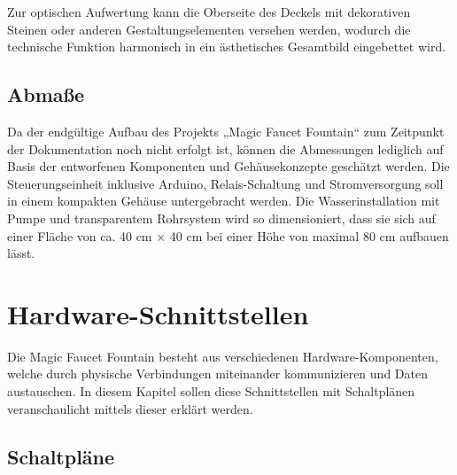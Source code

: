 Zur optischen Aufwertung kann die Oberseite des Deckels mit dekorativen Steinen oder anderen Gestaltungselementen versehen werden, wodurch die technische Funktion harmonisch in ein ästhetisches Gesamtbild eingebettet wird.

\subsection{Abmaße}
Da der endgültige Aufbau des Projekts „Magic Faucet Fountain“ zum Zeitpunkt der Dokumentation noch nicht erfolgt ist, können die Abmessungen lediglich auf Basis der entworfenen Komponenten und Gehäusekonzepte geschätzt werden. Die Steuerungseinheit inklusive Arduino, Relais-Schaltung und Stromversorgung soll in einem kompakten Gehäuse untergebracht werden. Die Wasserinstallation mit Pumpe und transparentem Rohrsystem wird so dimensioniert, dass sie sich auf einer Fläche von ca. 40 cm × 40 cm bei einer Höhe von maximal 80 cm aufbauen lässt.

\section{Hardware-Schnittstellen}
Die Magic Faucet Fountain besteht aus verschiedenen Hardware-Komponenten, welche durch physische Verbindungen miteinander kommunizieren und Daten austauschen. In diesem Kapitel sollen diese Schnittstellen mit Schaltplänen veranschaulicht mittels dieser erklärt werden.

\subsection{Schaltpläne}
